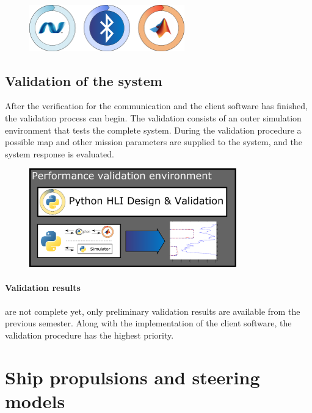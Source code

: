 \begin{figure}[H]
	\centering
	\includegraphics[width=0.6\textwidth]{img2/VeriBadges}
	\caption{}
	\label{}
\end{figure}

\subsection{Validation of the system}

After the verification for the communication and the client software has finished, the validation process can begin. The validation consists of an outer simulation environment that tests the complete system. During the validation procedure a possible map and other mission parameters are supplied to the system, and the system response is evaluated.



\begin{figure}[H]
	\centering
	\includegraphics[width=0.8\textwidth]{img2/HLIVali}
	\caption{}
	\label{}
\end{figure}

\paragraph{Validation results} are not complete yet, only preliminary validation results are available from the previous semester. Along with the implementation of the client software, the validation procedure has the highest priority.

\section{Ship propulsions and steering models}

